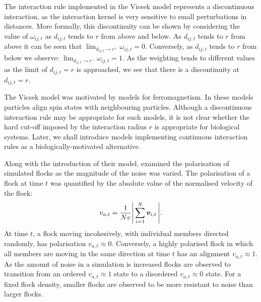 The interaction rule implemented in the Vicsek model represents a discontinuous
interaction, as the interaction kernel is very sensitive to small perturbations
in distances. More formally, this discontinuity can be shown by considering
the value of $\omega_{ij, t}$ as $d_{ij,t}$ tends to $r$ from above and below.
As $d_{ij,t}$ tends to $r$ from above it can be seen that $\lim_{d_{ij,t}
\rightarrow r^+} \omega_{ij,t} = 0$. Conversely, as $d_{ij,t}$ tends to $r$
from below we observe: $\lim_{d_{ij,t} \rightarrow r^-} \omega_{ij,t} = 1$. As
the weighting tends to different values as the limit of $d_{ij,t}=r$ is
approached, we see that there is a discontinuity at $d_{ij,t}=r$.

The Vicsek model was motivated by models for ferromagnetism. In these models
particles align spin states with neighbouring particles. Although a
discontinuous interaction rule may be appropriate for such models, it is not
clear whether the hard cut-off imposed by the interaction radius $r$ is
appropriate for biological systems. Later, we shall introduce models
implementing continuous interaction rules as a biologically-motivated
alternative.

Along with the introduction of their model, \cite{vicsek95} examined the
polarisation of simulated flocks as the magnitude of the noise was varied. The
polarisation of a flock at time $t$ was quantified by the absolute value of the
normalised velocity of the flock:
\begin{equation}
    \label{eq:alignment}
    v_{a,t} = \frac{1}{Nv} \abs{\,\sum_{i=1}^N \bm{v}_{i,t}\,}.
\end{equation}
At time $t$, a flock moving incohesively, with individual members directed
randomly, has polarisation $v_{a,t}\approx0$. Conversely, a highly polarised
flock in which all members are moving in the same direction at time $t$ has an
alignment $v_{a,t}\approx1$. As the amount of noise in a simulation is
increased flocks are observed to transition from an ordered $v_{a,t}\approx1$
state to a disordered $v_{a,t}\approx0$ state. For a fixed flock density,
smaller flocks are observed to be more resistant to noise than larger flocks.

